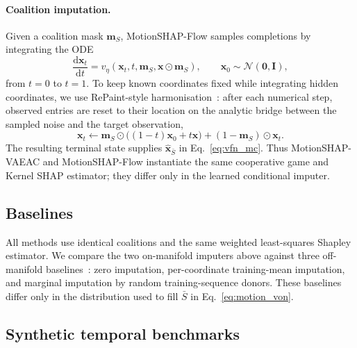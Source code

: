 \paragraph{Coalition imputation.}
Given a coalition mask $\mathbf{m}_S$, MotionSHAP-Flow samples completions by integrating the ODE
\begin{equation}
  \frac{\mathrm{d}\mathbf{x}_t}{\mathrm{d}t}
  =
  v_\eta(\mathbf{x}_t,t,\mathbf{m}_S,\mathbf{x}\odot\mathbf{m}_S),
  \qquad
  \mathbf{x}_0\sim\mathcal{N}(\mathbf{0},\mathbf{I}),
  \label{eq:flow_ode}
\end{equation}
from $t=0$ to $t=1$.  To keep known coordinates fixed while integrating hidden coordinates, we use RePaint-style harmonisation~\citep{lugmayr2022repaint}: after each numerical step, observed entries are reset to their location on the analytic bridge between the sampled noise and the target observation,
\begin{equation}
  \mathbf{x}_t \leftarrow
  \mathbf{m}_S\odot\big((1-t)\mathbf{x}_0+t\mathbf{x}\big)
  +(1-\mathbf{m}_S)\odot\mathbf{x}_t.
  \label{eq:repaint_harmonize}
\end{equation}
The resulting terminal state supplies $\hat{\mathbf{x}}_{\bar S}$ in Eq.~\eqref{eq:vfn_mc}.  Thus MotionSHAP-VAEAC and MotionSHAP-Flow instantiate the same cooperative game and Kernel SHAP estimator; they differ only in the learned conditional imputer.

\subsection{Baselines}
\label{sec:baselines}

All methods use identical coalitions and the same weighted least-squares Shapley estimator.  We compare the two on-manifold imputers above against three off-manifold baselines~\citep{frye2021shapley}: zero imputation, per-coordinate training-mean imputation, and marginal imputation by random training-sequence donors.  These baselines differ only in the distribution used to fill $\bar S$ in Eq.~\eqref{eq:motion_von}.

\subsection{Synthetic temporal benchmarks}
\label{sec:synthetic-benchmarks}

